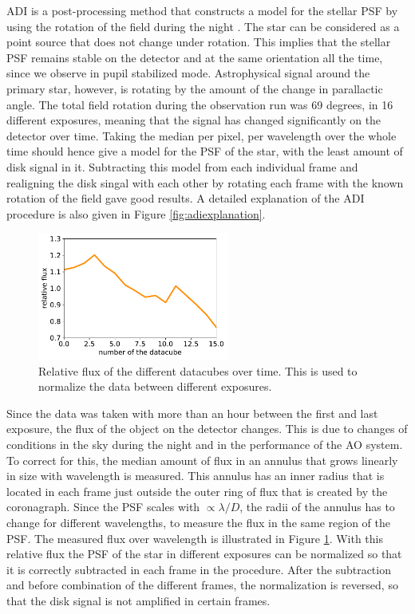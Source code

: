 \documentclass[twoside,single,12pt]{lion-msc}
\begin{document}
ADI is a post-processing method that constructs a model for the stellar PSF by using the rotation of the field during the night \cite{Marois2006}. The star can be considered as a point source that does not change under rotation. This implies that the stellar PSF remains stable on the detector and at the same orientation all the time, since we observe in pupil stabilized mode. Astrophysical signal around the primary star, however, is rotating by the amount of the change in parallactic angle. The total field rotation during the observation run was 69 degrees, in 16 different exposures, meaning that the signal has changed significantly on the detector over time. Taking the median per pixel, per wavelength over the whole time should hence give a model for the PSF of the star, with the least amount of disk signal in it. Subtracting this model from each individual frame and realigning the disk singal with each other by rotating each frame with the known rotation of the field gave good results. A detailed explanation of the ADI procedure is also given in Figure \ref{fig:adiexplanation}.
\bigskip

\begin{figure}
\centering
\includegraphics[width = 0.56\textwidth]{aonorm}
\caption{Relative flux of the different datacubes over time. This is used to normalize the data between different exposures.}
\label{fig:aonorm}
\end{figure}

Since the data was taken with more than an hour between the first and last exposure, the flux of the object on the detector changes. This is due to changes of conditions in the sky during the night and in the performance of the AO system. To correct for this, the median amount of flux in an annulus that grows linearly in size with wavelength is measured. This annulus has an inner radius that is located in each frame just outside the outer ring of flux that is created by the coronagraph. Since the PSF scales with $ \propto\lambda/D$, the radii of the annulus has to change for different wavelengths, to measure the flux in the same region of the PSF. The measured flux over wavelength is illustrated in Figure \ref{fig:aonorm}. With this relative flux the PSF of the star in different exposures can be normalized so that it is correctly subtracted in each frame in the procedure. After the subtraction and before combination of the different frames, the normalization is reversed, so that the disk signal is not amplified in certain frames.
\end{document}
